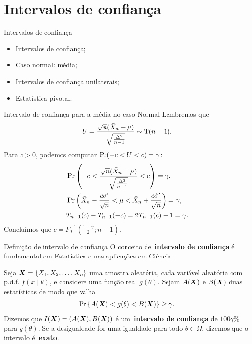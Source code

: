 \section{Intervalos de confiança}
\begin{frame}{Intervalos de confiança}
 \begin{itemize}
  \item Intervalos de confiança;
  \item Caso normal: média;
  \item Intervalos de confiança unilaterais;
  \item Estatística pivotal.  
 \end{itemize}
\end{frame}

\begin{frame}{Intervalo de confiança para a média no caso Normal}
 Lembremos que 
 \begin{equation}
 \label{eq:confidence_interval_normal_mean}
 U = \frac{\sqrt{n}(\bar{X}_n-\mu)}{\sqrt{\frac{\Delta^2}{n-1}}} \sim\operatorname{T}(n-1).
\end{equation}
Para $c>0$, podemos computar $\operatorname{Pr}(-c < U < c) = \gamma$:
\begin{align*}
 &\operatorname{Pr}\left(-c < \frac{\sqrt{n}(\bar{X}_n-\mu)}{\sqrt{\frac{\Delta^2}{n-1}}} < c\right) = \gamma,\\
 &\operatorname{Pr}\left( \bar{X}_n - \frac{c\hat{\sigma}^\prime}{\sqrt{n}} < \mu <  \bar{X}_n + \frac{c\hat{\sigma}^\prime}{\sqrt{n}}\right) = \gamma,\\
 &T_{n-1}(c) - T_{n-1}(-c) = 2T_{n-1}(c) - 1 = \gamma.
\end{align*}
Concluímos que $c = F_T^{-1}\left(\frac{1 + \gamma}{2}; n-1\right)$.
\end{frame}

\begin{frame}{Definição de intervalo de confiança}
 O conceito de~\textbf{intervalo de confiança} é fundamental em Estatística e nas aplicações em Ciência.
 \begin{defn}
 \label{def:confidence_interval}
  Seja $\boldsymbol{X} = \{ X_1, X_2, \ldots, X_n \}$ uma amostra aleatória, cada variável aleatória com p.d.f. $f(x\mid \theta)$, e considere uma função real $g(\theta)$.
  Sejam $A(\boldsymbol{X})$ e $B(\boldsymbol{X})$ duas estatísticas de modo que valha
  \begin{equation}
   \label{eq:confidence_interval}
   \operatorname{Pr}\left\{A(\boldsymbol{X}) < g(\theta) <  B(\boldsymbol{X})\right\} \geq \gamma.
  \end{equation}
Dizemos que $I(\boldsymbol{X}) = (A(\boldsymbol{X}), B(\boldsymbol{X}))$ é um~\textbf{intervalo de confiança} de $100\gamma\%$ para $g(\theta)$.
Se a desigualdade for uma igualdade para todo $\theta \in \Omega$, dizemos que o intervalo é~\textbf{exato}.
 \end{defn}
\end{frame}

